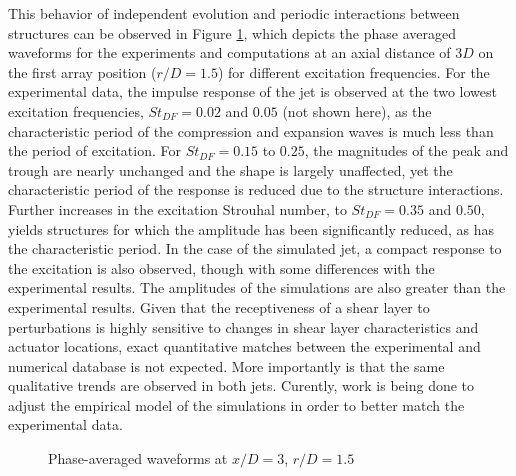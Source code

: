 \documentclass[english]{aiaa-tc}
\begin{document}
This behavior of independent evolution and periodic interactions between structures can be observed in Figure \ref{phase}, which depicts the phase averaged waveforms for the experiments and computations at an axial distance of $3D$ on the first array position ($r/D=1.5$) for different excitation frequencies. For the experimental data, the impulse response of the jet is observed at the two lowest excitation frequencies, $St_{DF} = 0.02$ and $0.05$ (not shown here), as the characteristic period of the compression and expansion waves is much less than the period of excitation. For $St_{DF} = 0.15$ to $0.25$, the magnitudes of the peak and trough are nearly unchanged and the shape is largely unaffected, yet the characteristic period of the response is reduced due to the structure interactions. Further increases in the excitation Strouhal number, to $St_{DF} = 0.35$ and $0.50$, yields structures for which the amplitude has been significantly reduced, as has the characteristic period. In the case of the simulated jet, a compact response to the excitation is also observed, though with some differences with the experimental results. The amplitudes of the simulations are also greater than the experimental results. Given that the receptiveness of a shear layer to perturbations is highly sensitive to changes in shear layer characteristics and actuator locations, exact quantitative matches between the experimental and numerical database is not expected. More importantly is that the same qualitative trends are observed in both jets. Curently, work is being done to adjust the empirical model of the simulations in order to better match the experimental data. 
\begin{figure}
\centering{}\caption{Phase-averaged waveforms at $x/D = 3$, $r/D = 1.5$}\label{phase}
\end{figure}
\end{document}
